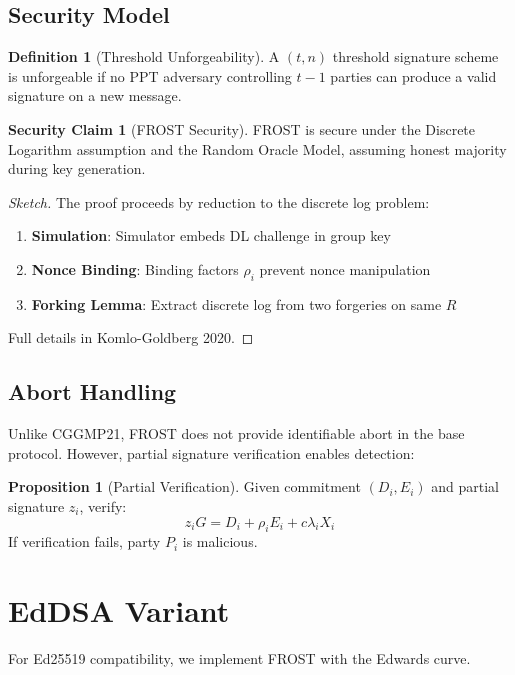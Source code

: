 \documentclass[11pt,a4paper]{article}
\theoremstyle{definition}
\newtheorem{definition}{Definition}
\newtheorem{proposition}{Proposition}
\newtheorem{security}{Security Claim}
\begin{document}
\subsection{Security Model}

\begin{definition}[Threshold Unforgeability]
A $(t,n)$ threshold signature scheme is unforgeable if no PPT adversary controlling $t-1$ parties can produce a valid signature on a new message.
\end{definition}

\begin{security}[FROST Security]
FROST is secure under the Discrete Logarithm assumption and the Random Oracle Model, assuming honest majority during key generation.
\end{security}

\begin{proof}[Sketch]
The proof proceeds by reduction to the discrete log problem:
\begin{enumerate}
\item \textbf{Simulation}: Simulator embeds DL challenge in group key
\item \textbf{Nonce Binding}: Binding factors $\rho_i$ prevent nonce manipulation
\item \textbf{Forking Lemma}: Extract discrete log from two forgeries on same $R$
\end{enumerate}
Full details in Komlo-Goldberg 2020.
\end{proof}

\subsection{Abort Handling}

Unlike CGGMP21, FROST does not provide identifiable abort in the base protocol. However, partial signature verification enables detection:

\begin{proposition}[Partial Verification]
Given commitment $(D_i, E_i)$ and partial signature $z_i$, verify:
\[
z_i G = D_i + \rho_i E_i + c \lambda_i X_i
\]
If verification fails, party $P_i$ is malicious.
\end{proposition}

\section{EdDSA Variant}

For Ed25519 compatibility, we implement FROST with the Edwards curve.
\end{document}
